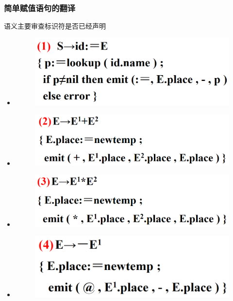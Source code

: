 \documentclass[UTF8,a4paper]{ctexart}
\begin{document}
 \subsubsection{简单赋值语句的翻译}
 语义主要审查标识符是否已经声明
 \begin{itemize}
  \item \begin{figure}[H]
         \centering
         \includegraphics[scale = 0.3]{assets/CompilerConstructionPrinciples_733a7.png}
        \end{figure}
  \item \begin{figure}[H]
         \centering
         \includegraphics[scale = 0.3]{assets/CompilerConstructionPrinciples_74c0a.png}
        \end{figure}
  \item \begin{figure}[H]
         \centering
         \includegraphics[scale = 0.3]{assets/CompilerConstructionPrinciples_f88bc.png}
        \end{figure}
  \item \begin{figure}[H]
         \centering
         \includegraphics[scale = 0.3]{assets/CompilerConstructionPrinciples_45864.png}

\end{figure}
\end{itemize}
\end{document}
